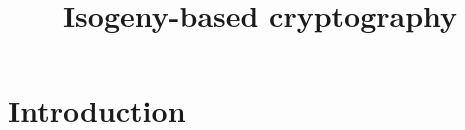 \documentclass[12pt]{article}
\title{Isogeny-based cryptography}
\author{}
\date{}
\begin{document}
\maketitle
\renewcommand{\contentsname}{Table of content}
\tableofcontents
\newpage

%

\section{Introduction}

\newpage



%
\end{document}
